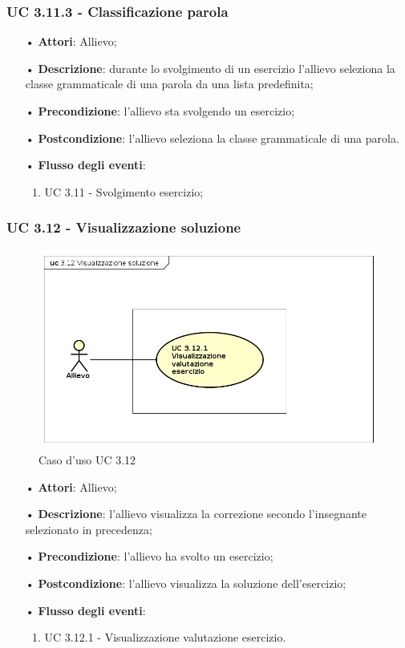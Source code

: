 \subsubsection{UC 3.11.3 - Classificazione parola}
\begin{itemize}
	\item[•]\textbf{Attori}: Allievo;
	\item[•]\textbf{Descrizione}: durante lo svolgimento di un esercizio  l'allievo seleziona la classe grammaticale di una parola da una lista predefinita;
	\item[•]\textbf{Precondizione}: l'allievo sta svolgendo un esercizio;
	\item[•]\textbf{Postcondizione}: l'allievo seleziona la classe grammaticale di una parola.
	\item[•]\textbf{Flusso degli eventi}: 
	\begin{enumerate}
		\item UC 3.11 - Svolgimento esercizio;
	\end{enumerate}
\end{itemize}


\subsubsection{UC 3.12 - Visualizzazione soluzione}
\begin{figure}[H]
	\centering
	\includegraphics[width=17cm]{img/UC312.png} 
	\caption{Caso d'uso UC 3.12}\label{fig:312}
\end{figure}
\begin{itemize}
	\item[•]\textbf{Attori}: Allievo;
	\item[•]\textbf{Descrizione}: l'allievo visualizza la correzione secondo l'insegnante selezionato in precedenza;
	\item[•]\textbf{Precondizione}: l'allievo ha svolto un esercizio;
	\item[•]\textbf{Postcondizione}: l'allievo visualizza la soluzione dell'esercizio;
	\item[•]\textbf{Flusso degli eventi}:
	\begin{enumerate}
		\item UC 3.12.1 - Visualizzazione valutazione esercizio.  
	\end{enumerate}
\end{itemize}


